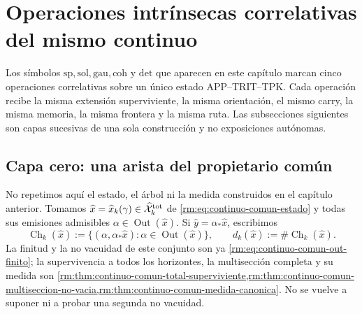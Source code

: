 \chapter{Operaciones intrínsecas correlativas del mismo continuo}
\label{rm:chap:pdfv2-operaciones-intrinsecas-correlativas}

\begin{thesisbox}
Los símbolos \(\mathrm{sp},\mathrm{sol},\mathrm{gau},\mathrm{coh}\) y
\(\mathrm{det}\) que aparecen en este capítulo marcan cinco operaciones
correlativas sobre un único estado APP--TRIT--TPK\@. Cada operación recibe
la misma extensión superviviente, la
misma orientación, el mismo carry, la misma memoria, la misma frontera y la
misma ruta. Las subsecciones siguientes son capas sucesivas de una sola
construcción y no exposiciones autónomas.
\end{thesisbox}

\section{Capa cero: una arista del propietario común}

No repetimos aquí el estado, el árbol ni la medida construidos en el capítulo
anterior. Tomamos
\(\widehat x=\widehat x_k(\gamma)\in
\widehat{\mathcal X}^{\rm tot}_k\) de
\eqref{rm:eq:continuo-comun-estado} y todas sus emisiones admisibles
\(\alpha\in\operatorname{Out}(\widehat x)\). Si
\(\widehat y=\alpha_*\widehat x\), escribimos
\begin{equation}
\label{rm:eq:pdfv2-cor-hijos-supervivientes}
 \operatorname{Ch}_k(\widehat x):=
 \{(\alpha,\alpha_*\widehat x):
      \alpha\in\operatorname{Out}(\widehat x)\},
 \qquad
 d_k(\widehat x):=\#\operatorname{Ch}_k(\widehat x).
\end{equation}
La finitud y la no vacuidad de este conjunto son ya
\eqref{rm:eq:continuo-comun-out-finito}; la supervivencia a todos los horizontes,
la multisección completa y su medida son
\cref{rm:thm:continuo-comun-total-superviviente,rm:thm:continuo-comun-multiseccion-no-vacia,rm:thm:continuo-comun-medida-canonica}. No se vuelve a suponer ni a probar una
segunda no vacuidad.

